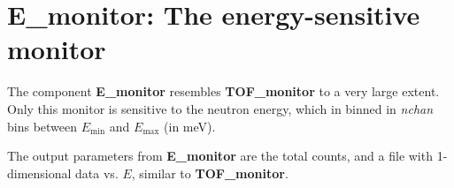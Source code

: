 \section{E\_monitor: The energy-sensitive monitor} \label{s:E_monitor}

The component \textbf{E\_monitor} resembles \textbf{TOF\_monitor}
to a very large extent. Only this monitor is sensitive to
the neutron energy, which in binned in \textit{nchan} bins between
$E_\textrm{min}$ and $E_\textrm{max}$ (in meV).

The output parameters from \textbf{E\_monitor} are the total counts,
and a file with 1-dimensional data vs. $E$, similar to \textbf{TOF\_monitor}.


